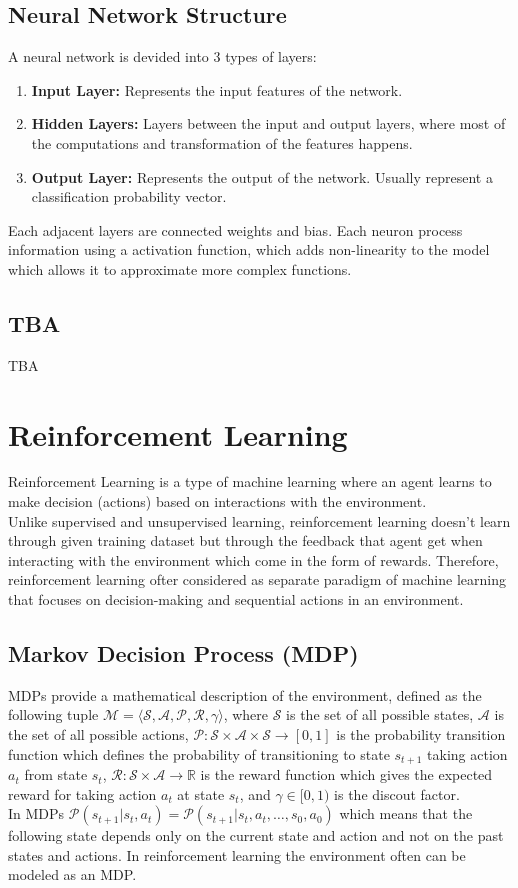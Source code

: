 \documentclass[12pt,a4paper]{report}
\begin{document}
\subsection{Neural Network Structure}
A neural network is devided into 3 types of layers:
\begin{enumerate}
    \item \textbf{Input Layer:} Represents the input features of the network.
    \item \textbf{Hidden Layers:} Layers between the input and output layers, where most of the computations and transformation of the features happens.
    \item \textbf{Output Layer:} Represents the output of the network. Usually represent a classification probability vector.
\end{enumerate}
Each adjacent layers are connected weights and bias. Each neuron process information using a activation function, which adds non-linearity to the model which allows it to approximate more complex functions.
\subsection{TBA}
TBA
\section{Reinforcement Learning}
Reinforcement Learning is a type of machine learning where an agent learns to make decision (actions) based on interactions with the environment.\\
Unlike supervised and unsupervised learning, reinforcement learning doesn't learn through given training dataset but through the feedback that agent get when interacting with the environment which come in the form of rewards. Therefore, reinforcement learning ofter considered as separate paradigm of machine learning that focuses on decision-making and sequential actions in an environment.
\subsection{Markov Decision Process (MDP)}
MDPs provide a mathematical description of the environment, defined as the following tuple $\mathcal{M}=\langle\mathcal{S},\mathcal{A},\mathcal{P},\mathcal{R},\gamma\rangle$, where $\mathcal{S}$ is the set of all possible states, $\mathcal{A}$ is the set of all possible actions, $\mathcal{P}:\mathcal{S}\times\mathcal{A}\times\mathcal{S}\to[0,1]$ is the probability transition function which defines the probability of transitioning to state $s_{t+1}$ taking action $a_t$ from state $s_t$, $\mathcal{R}:\mathcal{S}\times\mathcal{A}\to\mathbb{R}$ is the reward function which gives the expected reward for taking action $a_t$ at state $s_t$, and $\gamma\in[0,1)$ is the discout factor.\\
In MDPs $\mathcal{P}(s_{t+1}|s_t,a_t)=\mathcal{P}(s_{t+1}|s_t,a_t,\dots,s_0,a_0)$ which means that the following state depends only on the current state and action and not on the past states and actions. In reinforcement learning the environment often can be modeled as an MDP.
\end{document}

